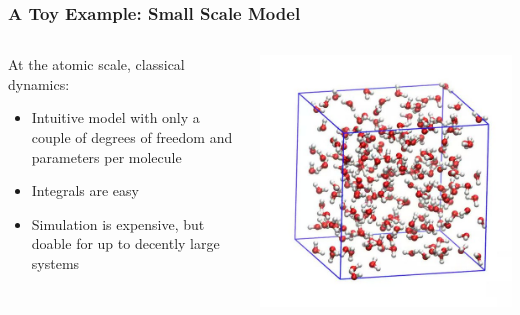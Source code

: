 \documentclass[aspectratio=169, 12pt]{beamer}
\begin{document}
\begin{frame}

    \frametitle{A Toy Example: Small Scale Model}

    \begin{columns}
        
    \begin{column}{.6\textwidth}
        At the atomic scale, classical dynamics:

        \begin{itemize}
            \item Intuitive model with only a couple of degrees of freedom and parameters per molecule
            \item Integrals are easy
            \item Simulation is expensive, but doable for up to decently large systems
        \end{itemize}
    \end{column}
    \begin{column}{.4\textwidth}
        \includegraphics[width=\textwidth]{images/molecular-dynamics.jpg}
    \end{column}
    \end{columns}

\end{frame}
\end{document}
